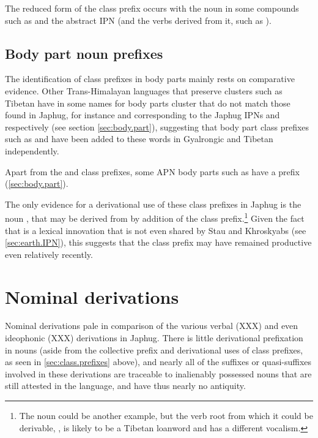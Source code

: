 The reduced form  of the class prefix occurs with the noun  in some compounds such as  and the abstract IPN  (and the verbs derived from it, such as ).
  
\subsection{Body part noun prefixes}  \label{ex:body.part.prefix}
The identification of class prefixes in body parts mainly rests on comparative evidence. Other Trans-Himalayan languages that preserve clusters such as Tibetan have in some names for body parts cluster that do not match those found in Japhug, for instance  and  corresponding to the Japhug IPNs  and  respectively (see section \ref{sec:body.part}), suggesting that body part class prefixes such as  and  have been added to these words in Gyalrongic and Tibetan independently.

Apart from the  and  class prefixes, some APN body parts such as  have a   prefix (\ref{sec:body.part}).

The only evidence for a derivational use of these class prefixes in Japhug is the noun , that may be derived from  by addition of the  class prefix.\footnote{The noun  could be another example, but the verb root from which it could be derivable, , is likely to be a Tibetan loanword and has a different vocalism. } Given the fact that  is a lexical innovation that is not even shared by Stau and Khroskyabs (see \ref{sec:earth.IPN}), this suggests that the class prefix  may have remained productive even relatively recently.

\section{Nominal derivations}
Nominal derivations pale in comparison of the various verbal (XXX) and even ideophonic (XXX) derivations in Japhug. There is little derivational prefixation in nouns (aside from the collective  prefix and derivational uses of class prefixes, as seen in \ref{sec:class.prefixes} above), and nearly all of the suffixes or quasi-suffixes involved in these derivations are traceable to inalienably possessed nouns that are still attested in the language, and have thus nearly no antiquity. 

